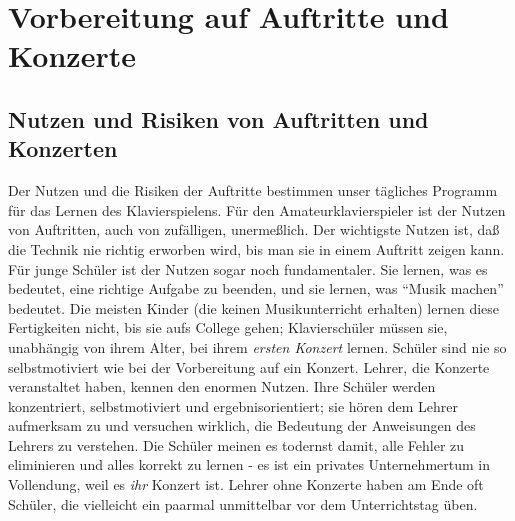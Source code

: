 
\section{Vorbereitung auf Auftritte und Konzerte}
\label{c1iii14} 

\subsection{Nutzen und Risiken von Auftritten und Konzerten}
\label{c1iii14a}

Der Nutzen und die Risiken der Auftritte bestimmen unser tägliches Programm für das Lernen des Klavierspielens.
Für den Amateurklavierspieler ist der Nutzen von Auftritten, auch von zufälligen, unermeßlich.
Der wichtigste Nutzen ist, daß die Technik nie richtig erworben wird, bis man sie in einem Auftritt zeigen kann.
Für junge Schüler ist der Nutzen sogar noch fundamentaler.
Sie lernen, was es bedeutet, eine richtige Aufgabe zu beenden, und sie lernen, was \enquote{Musik machen} bedeutet.
Die meisten Kinder (die keinen Musikunterricht erhalten) lernen diese Fertigkeiten nicht, bis sie aufs College gehen; Klavierschüler müssen sie, unabhängig von ihrem Alter, bei ihrem \textit{ersten Konzert} lernen.
Schüler sind nie so selbstmotiviert wie bei der Vorbereitung auf ein Konzert.
Lehrer, die Konzerte veranstaltet haben, kennen den enormen Nutzen.
Ihre Schüler werden konzentriert, selbstmotiviert und ergebnisorientiert; sie hören dem Lehrer aufmerksam zu und versuchen wirklich, die Bedeutung der Anweisungen des Lehrers zu verstehen.
Die Schüler meinen es todernst damit, alle Fehler zu eliminieren und alles korrekt zu lernen - es ist ein privates Unternehmertum in Vollendung, weil es \textit{ihr} Konzert ist.
Lehrer ohne Konzerte haben am Ende oft Schüler, die vielleicht ein paarmal unmittelbar vor dem Unterrichtstag üben.

